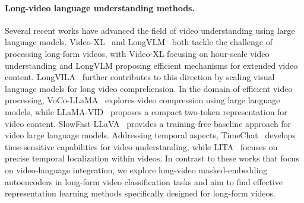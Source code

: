 \paragraph{Long-video language understanding methods.} Several recent works have advanced the field of video understanding using large language models. Video-XL~\cite{shu2024video} and LongVLM~\cite{weng2024longvlm} both tackle the challenge of processing long-form videos, with Video-XL focusing on hour-scale video understanding and LongVLM proposing efficient mechanisms for extended video content. LongVILA~\cite{chen2024longvila} further contributes to this direction by scaling visual language models for long video comprehension. In the domain of efficient video processing, VoCo-LLaMA~\cite{ye2024voco} explores video compression using large language models, while LLaMA-VID~\cite{li2024llama} proposes a compact two-token representation for video content. SlowFast-LLaVA~\cite{xu2024slowfast} provides a training-free baseline approach for video large language models. Addressing temporal aspects, TimeChat~\cite{ren2024timechat} develops time-sensitive capabilities for video understanding, while LITA~\cite{huang2024lita} focuses on precise temporal localization within videos. In contrast to these works that focus on video-language integration, we explore long-video masked-embedding autoencoders in long-form video classification tasks and aim to find effective representation learning methods specifically designed for long-form videos.
